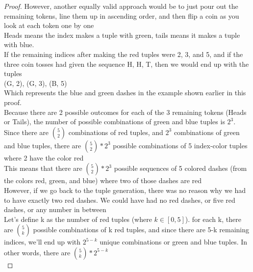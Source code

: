 \documentclass[11pt,fleqn]{article}
\theoremstyle{definition}
\theoremstyle{remark}
\begin{document}
\begin{enumerate}
\begin{proof}
        However, another equally valid approach would be to just 
        pour out the remaining tokens, line them up in ascending order,
        and then flip a coin as you look at each token one by one\\

        Heads means the index makes a tuple with green, tails means it
        makes a tuple with blue.\\
        
        If the remaining indices after making
        the red tuples were 2, 3, and 5, and if the three coin tosses
        had given the sequence H, H, T, then we would end up with the
        tuples\\

        (G, 2), (G, 3), (B, 5)\\

        Which represents the blue and green dashes in the example shown
        earlier in this proof.\\

        Because there are 2 possible outcomes for each of the 
        3 remaining tokens (Heads or Tails), the number of possible 
        combinations of green and blue tuples is ${2}^{3}$.\\

        Since there are $\binom{5}{2}$ combinations of red tuples, 
        and ${2}^{3}$ combinations of green and blue tuples,
        there are $\binom{5}{2} * {2}^{3}$ possible combinations of
        5 index-color tuples where 2 have the color red\\

        This means that there are $\binom{5}{2} * {2}^{3}$ 
        possible sequences of 5 colored dashes
        (from the colors red, green, and blue) 
        where two of those dashes are red\\

        However, if we go back to the tuple generation, there was no
        reason why we had to have exactly two red dashes. We could have
        had no red dashes, or five red dashes, or any number in between\\

        Let's define k as the number of red tuples (where $k \in [0, 5]$).
        for each k, there are $\binom{5}{k}$ possible combinations
        of k red tuples, and since there are 5-k remaining indices, we'll end up
        with ${2}^{{5}-{k}}$ unique combinations or green and blue
        tuples. In other words, there are $\binom{5}{k} * {2}^{5-k}$\\


\end{proof}
\end{enumerate}
\end{document}
